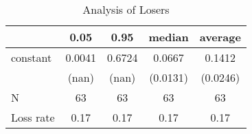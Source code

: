 \begin{table}
\caption{Analysis of Losers}
\begin{center}
\begin{tabular}{lcccc}
\hline
          &  0.05  &  0.95  &  median  & average   \\
\midrule
\midrule
constant  & 0.0041 & 0.6724 & 0.0667   & 0.1412    \\
          & (nan)  & (nan)  & (0.0131) & (0.0246)  \\
N         & 63     & 63     & 63       & 63        \\
Loss rate & 0.17   & 0.17   & 0.17     & 0.17      \\
\hline
\end{tabular}
\end{center}
\end{table}